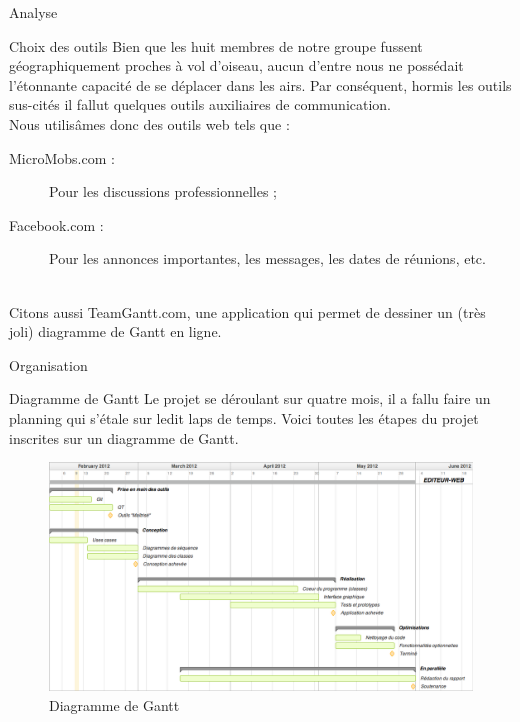\documentclass[a4paper, 12pt]{report}
\begin{document}
\begin{part}{Analyse}
\begin{chapter}{Choix des outils}
			Bien que les huit membres de notre groupe fussent géographiquement proches à vol d'oiseau, aucun d'entre nous ne possédait l'étonnante
			capacité de se déplacer dans les airs. Par conséquent, hormis les outils sus-cités il fallut quelques outils auxiliaires de communication.
			\\
			Nous utilisâmes donc des outils web tels que :
			\begin{description}
				\item[MicroMobs.com :] Pour les discussions professionnelles ;
				\item[Facebook.com :] Pour les annonces importantes, les messages, les dates de réunions, etc.
			\end{description}~\\

			Citons aussi TeamGantt.com, une application qui permet de dessiner un (très joli) \gls{diagramme de Gantt} en ligne.
		\end{chapter}
		\begin{chapter}{Organisation}
			\begin{section}{Diagramme de Gantt}
				Le projet se déroulant sur quatre mois, il a fallu faire un planning qui s'étale sur ledit laps de temps.
				Voici toutes les étapes du projet inscrites sur un \gls{diagramme de Gantt}.
				\begin{figure}[h]
					\begin{center}
						\includegraphics[width=17cm]{images/DiagrammeGantt.png}
						\caption{Diagramme de Gantt}
						\label{flute}
					\end{center}
				\end{figure}~\\
			\end{section}
		\end{chapter}
	\end{part}
\end{document}
